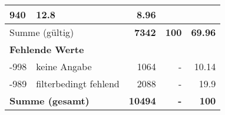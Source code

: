 \begin{longtable}{lXrrr}
       \num{940} &
       \num[round-mode=places,round-precision=2]{12.8} &
         \num[round-mode=places,round-precision=2]{8.96} \\
     \midrule
     \multicolumn{2}{l}{Summe (gültig)} &
       \textbf{\num{7342}} &
     \textbf{\num{100}} &
       \textbf{\num[round-mode=places,round-precision=2]{69.96}} \\
     \multicolumn{5}{l}{\textbf{Fehlende Werte}}\\
       -998 &
       keine Angabe &
         \num{1064} &
        - &
         \num[round-mode=places,round-precision=2]{10.14} \\
       -989 &
       filterbedingt fehlend &
         \num{2088} &
        - &
         \num[round-mode=places,round-precision=2]{19.9} \\
     \midrule
     \multicolumn{2}{l}{\textbf{Summe (gesamt)}} &
          \textbf{\num{10494}} &
        \textbf{-} &
        \textbf{\num{100}} \\
     \bottomrule
     \end{longtable}
     
